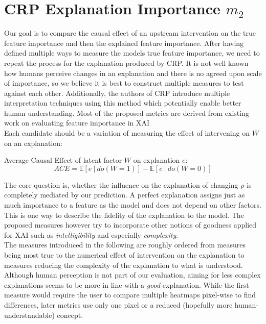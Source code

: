 \section{CRP Explanation Importance $m_2$}\label{section:measure}
Our goal is to compare the causal effect of an upstream intervention on the true feature importance and then the explained feature importance. After having defined multiple ways to measure the models true feature importance, we need to repeat the process for the explanation produced by CRP. It is not well known how humans perceive changes in an explanation and there is no agreed upon scale of importance, so we believe it is best to construct multiple measures to test against each other. {\color{gray} Additionally, the authors of CRP introduce multiple interpretation techniques using this method which potentially enable better human understanding. }Most of the proposed metrics are derived from existing work on evaluating feature importance in XAI \cite{Sixt2020, Karimi2023, Arras2022} \\

Each candidate should be a variation of measuring the effect of intervening on $W$ on an explanation:
\begin{center}
Average Causal Effect of latent factor $W$ on explanation $e$: \\
\begin{equation}
\displaystyle ACE = \mathbb{E} [e \ | \ do(W=1) ] - \mathbb{E} [ e \ | \ do(W=0) ]
\end{equation}
\end{center}
The core question is, whether the influence on the explanation of changing $\rho$ is completely mediated by our prediction. A perfect explanation assigns just as much importance to a feature as the model and does not depend on other factors. This is one way to describe the fidelity of the explanation to the model. The proposed measures however try to incorporate other notions of goodness applied for XAI such as \textit{intelligibility} and especially \textit{complexity}. \\

The measures introduced in the following are roughly ordered from measures being most true to the numerical effect of intervention on the explanation to measures reducing the complexity of the explanation to what is understood. Although human perception is not part of our evaluation, aiming for less complex explanations seems to be more in line with a \textit{good} explanation. While the first measure would require the user to compare multiple heatmaps pixel-wise to find differences, later metrics use only one pixel or a reduced (hopefully more human-understandable) concept. \\

